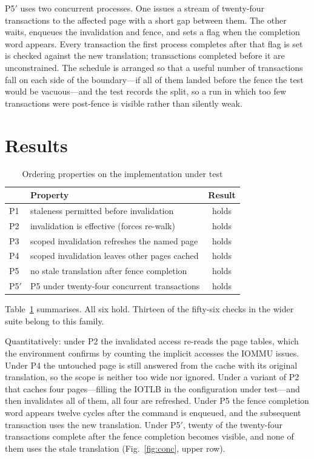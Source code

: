 \documentclass[journal]{IEEEtran}
\begin{document}
P5$'$ uses two concurrent processes. One issues a stream of twenty-four
transactions to the affected page with a short gap between them. The other
waits, enqueues the invalidation and fence, and sets a flag when the completion
word appears. Every transaction the first process completes after that flag is
set is checked against the new translation; transactions completed before it are
unconstrained. The schedule is arranged so that a useful number of transactions
fall on each side of the boundary---if all of them landed before the fence the
test would be vacuous---and the test records the split, so a run in which too
few transactions were post-fence is visible rather than silently weak.

\section{Results}

\begin{table}[!t]
\caption{Ordering properties on the implementation under test}
\label{tab:props}
\centering\footnotesize
\begin{tabular}{llc}
\toprule
 & Property & Result \\
\midrule
P1  & staleness permitted before invalidation & holds \\
P2  & invalidation is effective (forces re-walk) & holds \\
P3  & scoped invalidation refreshes the named page & holds \\
P4  & scoped invalidation leaves other pages cached & holds \\
P5  & no stale translation after fence completion & holds \\
P5$'$ & P5 under twenty-four concurrent transactions & holds \\
\bottomrule
\end{tabular}
\end{table}

Table~\ref{tab:props} summarises. All six hold. Thirteen of the fifty-six checks
in the wider suite belong to this family.

Quantitatively: under P2 the invalidated access re-reads the page tables, which
the environment confirms by counting the implicit accesses the IOMMU issues.
Under P4 the untouched page is still answered from the cache with its original
translation, so the scope is neither too wide nor ignored. Under a variant of P2
that caches four pages---filling the IOTLB in the configuration under test---and
then invalidates all of them, all four are refreshed. Under P5 the fence
completion word appears twelve cycles after the command is enqueued, and the
subsequent transaction uses the new translation. Under P5$'$, twenty of the
twenty-four transactions complete after the fence completion becomes visible,
and none of them uses the stale translation (Fig.~\ref{fig:conc}, upper row).
\end{document}
